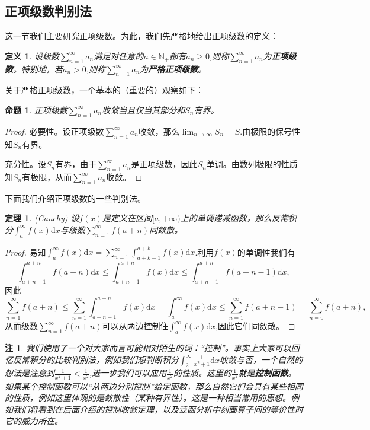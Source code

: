 \documentclass{article}
\newtheorem{definition}{定义}[subsection]
\newtheorem{theorem}{定理}[subsection]
\newtheorem{proposition}{命题}[subsection]
\newtheorem{note}{注}[subsection]
\begin{document}
\subsection{正项级数判别法}
这一节我们主要研究正项级数。为此，我们先严格地给出正项级数的定义：
\begin{definition}
设级数$\sum_{n=1}^\infty a_n$满足对任意的$n\in\mathbb{N}_+$都有$a_n\ge 0$,则称$\sum_{n=1}^\infty a_n$为\textbf{正项级数}。特别地，若$a_n>0$,则称$\sum_{n=1}^\infty a_n$为\textbf{严格正项级数}。
\end{definition}
关于严格正项级数，一个基本的（重要的）观察如下：
\begin{proposition}
正项级数$\sum_{n=1}^\infty a_n$收敛当且仅当其部分和$S_n$有界。
\end{proposition}
\begin{proof}
必要性。设正项级数$\sum_{n=1}^\infty a_n$收敛，那么$\lim_{n\to\infty}S_n=S$.由极限的保号性知$S_n$有界。\par
充分性。设$S_n$有界，由于$\sum_{n=1}^\infty a_n$是正项级数，因此$S_n$单调。由数列极限的性质知$S_n$有极限，从而$\sum_{n=1}^\infty a_n$收敛。
\end{proof}
下面我们介绍正项级数的一些判别法。
\begin{theorem}(Cauchy)
设$f(x)$是定义在区间$[a,+\infty)$上的单调递减函数，那么反常积分$\int_a^\infty f(x)\mathrm{d}x$与级数$\sum_{n=1}^\infty f(a+n)$同敛散。
\end{theorem}
\begin{proof}
易知$\int_a^\infty f(x)\mathrm{d}x=\sum_{n=1}^\infty\int_{a+k-1}^{a+k}f(x)\mathrm{d}x$.利用$f(x)$的单调性我们有
$$
\int_{a+n-1}^{a+n}{f\left( a+n \right) \mathrm{d}x}\le \int_{a+n-1}^{a+n}{f\left( x \right) \mathrm{d}x}\le \int_{a+n-1}^{a+n}{f\left( a+n-1 \right) \mathrm{d}x},
$$
因此
$$
\sum_{n=1}^{\infty}{f\left( a+n \right)}\le \sum_{n=1}^{\infty}{\int_{a+n-1}^{a+n}{f\left( x \right) \mathrm{d}x}}=\int_a^{\infty}{f\left( x \right) \mathrm{d}x}\le \sum_{n=1}^{\infty}{f\left( a+n-1 \right)}=\sum_{n=0}^{\infty}{f\left( a+n \right)},
$$
从而级数$\sum_{n=1}^\infty f(a+n)$可以从两边控制住$\int_a^\infty f(x)\mathrm{d}x$,因此它们同敛散。
\end{proof}
\begin{note}
我们使用了一个对大家而言可能相对陌生的词：“控制”。事实上大家可以回忆反常积分的比较判别法，例如我们想判断积分$\int_2^\infty\frac{1}{x^2+1}\mathrm{d}x$收敛与否，一个自然的想法是注意到$\frac{1}{x^2+1}<\frac{1}{x^2}$,进一步我们可以应用$\frac{1}{x^2}$的性质。这里的$\frac{1}{x^2}$就是\textbf{控制函数}。如果某个控制函数可以“从两边分别控制”给定函数，那么自然它们会具有某些相同的性质，例如这里体现的是敛散性（某种有界性）。这是一种相当常用的思想。例如我们将看到在后面介绍的控制收敛定理，以及泛函分析中刻画算子间的等价性时它的威力所在。
\end{note}
\end{document}
